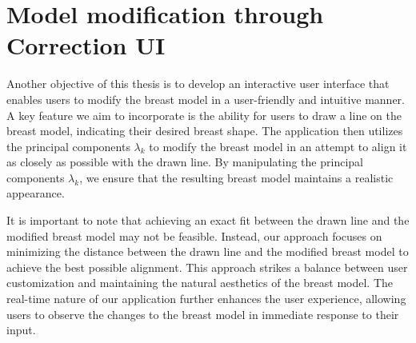 \section{Model modification through Correction UI}\label{sec:correction_ui}

Another objective of this thesis is to develop an interactive user interface that enables users to modify the breast model in a user-friendly and intuitive manner. A key feature we aim to 
incorporate is the ability for users to draw a line on the breast model, indicating their desired breast shape. The application then utilizes the principal components $\lambda_k$ to modify 
the breast model in an attempt to align it as closely as possible with the drawn line. By manipulating the principal components $\lambda_k$, we ensure that the resulting breast model 
maintains a realistic appearance.

It is important to note that achieving an exact fit between the drawn line and the modified breast model may not be feasible. Instead, our approach focuses on minimizing the distance 
between the drawn line and the modified breast model to achieve the best possible alignment. This approach strikes a balance between user customization and maintaining the natural 
aesthetics of the breast model. The real-time nature of our application further enhances the user experience, allowing users to observe the changes to the breast model in immediate 
response to their input.

